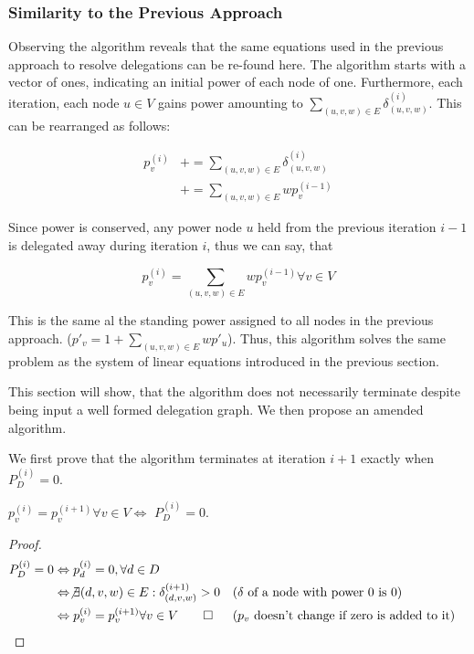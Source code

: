 \subsubsection{Similarity to the Previous Approach}

Observing the algorithm reveals that the same equations used in the previous approach to resolve delegations can be re-found here. The algorithm starts with a vector of ones, indicating an initial power of each node of one. Furthermore, each iteration, each node $u \in V$ gains power amounting to $\sum_{(u, v, w) \in E} \delta^{(i)}_{(u, v, w)}$. This can be rearranged as follows:

\begin{align*}
p_v^{(i)} &+= \sum_{(u, v, w) \in E} \delta^{(i)}_{(u, v, w)} \\
&+= \sum_{(u, v, w) \in E} wp_v^{(i-1)}
\end{align*}

Since power is conserved, any power node $u$ held from the previous iteration $i - 1$ is delegated away during iteration $i$, thus we can say, that

\[
p_v^{(i)} = \sum_{(u, v, w) \in E} wp_v^{(i-1)} \forall v \in V
\]


This is the same al the standing power assigned to all nodes in the previous approach. ($p'_v = 1 + \sum_{(u, v, w) \in E} wp'_u$). Thus, this algorithm solves the same problem as the system of linear equations introduced in the previous section. 

This section will show, that the algorithm does not necessarily terminate despite being input a well formed delegation graph. We then propose an amended algorithm.

We first prove that the algorithm terminates at iteration $i+1$ exactly when $P_D^{(i)} = 0$.

\begin{lemma}\label{lem:simple_alg_terminates}
 $p_v^{(i)} = p_v^{(i+1)} \forall v \in V \Leftrightarrow$ $P_D^{(i)} = 0$.
\end{lemma}
\begin{proof}

\begin{align*}
	P_D^{(i)} = 0 
	&\Leftrightarrow p_d^{(i)} = 0, \forall d \in D \\
	&\Leftrightarrow \not\exists (d, v, w) \in E: \delta_{(d, v, w)}^{(i+1)} > 0  &&\text{($\delta$ of a node with power 0 is 0)}\\
	&\Leftrightarrow p_v^{(i)} = p_v^{(i+1)} \forall v \in V \qed  &&\text{($p_v$ doesn't change if zero is added to it)}
\end{align*}
\end{proof}

